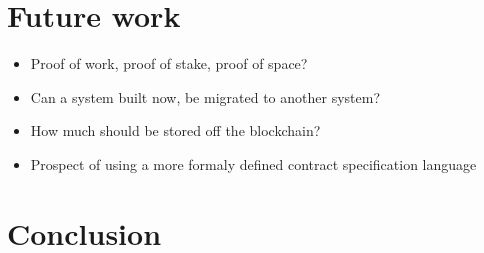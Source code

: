 \documentclass[oneside,a4paper,10pts,article]{memoir}
\begin{document}



\chapter{Future work}
\label{sec:futurework}

\begin{itemize}
\item Proof of work, proof of stake, proof of space?
\item Can a system built now, be migrated to another system?
\item How much should be stored off the blockchain?
\item Prospect of using a more formaly defined contract specification language
\end{itemize}

\chapter{Conclusion}
\label{sec:conclusion}






\end{document}
